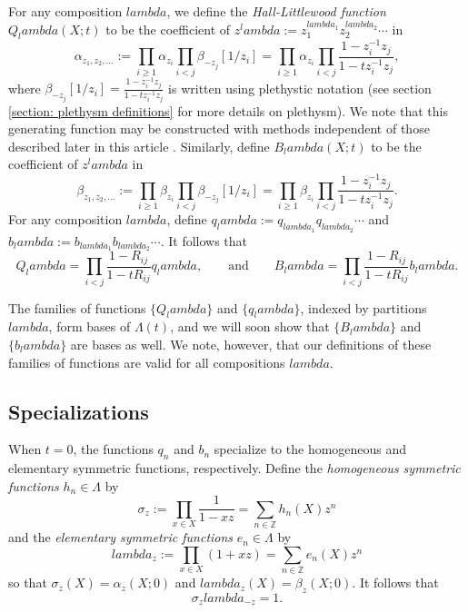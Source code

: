 \documentclass[12pt]{amsart}%
\def\lambda{lambda}%
\theoremstyle{remark}
\theoremstyle{definition}
\newcommand{\Z}{\mathbb{Z}}
\begin{document}
    For any composition $\lambda$, we define the \emph{Hall-Littlewood function} $Q_\lambda(X;t)$ to be the coefficient of $z^\lambda:=z_1^{\lambda_1}z_2^{\lambda_2}\cdots$ in
    \begin{equation}
        \alpha_{z_1,z_2,\ldots}:=\prod_{i\geq1}\alpha_{z_i}\prod_{i<j}\beta_{-z_j}[1/z_i]=\prod_{i\geq1}\alpha_{z_i}\prod_{i<j}\frac{1-z_i^{-1}z_j}{1-tz_i^{-1}z_j},
    \end{equation}
    where $\beta_{-z_j}[1/z_i]=\frac{1-z_i^{-1}z_j}{1-tz_i^{-1}z_j}$ is written using plethystic notation (see section \ref{section: plethysm definitions} for more details on plethysm). We note that this generating function may be constructed with methods independent of those described later in this article \cite[p.~211]{macdonald:1995}. Similarly, define $B_\lambda(X;t)$ to be the coefficient of $z^\lambda$ in
    \begin{equation}
        \beta_{z_1,z_2,\ldots}:=\prod_{i\geq1}\beta_{z_i}\prod_{i<j}\beta_{-z_j}[1/z_i]=\prod_{i\geq1}\beta_{z_i}\prod_{i<j}\frac{1-z_i^{-1}z_j}{1-tz_i^{-1}z_j}.
    \end{equation}
    For any composition $\lambda$, define $q_\lambda:=q_{\lambda_1}q_{\lambda_2}\cdots$ and $b_\lambda:=b_{\lambda_1}b_{\lambda_2}\cdots$. It follows that
    \begin{equation}\label{eqn: raising operator formulas}
        Q_\lambda=\prod_{i<j}\frac{1-R_{ij}}{1-tR_{ij}}q_\lambda,\qquad\text{and}\qquad B_\lambda=\prod_{i<j}\frac{1-R_{ij}}{1-tR_{ij}}b_\lambda.
    \end{equation}

    The families of functions $\{Q_\lambda\}$ and $\{q_\lambda\}$, indexed by partitions $\lambda$, form bases of $\Lambda(t)$, and we will soon show that $\{B_\lambda\}$ and $\{b_\lambda\}$ are bases as well. We note, however, that our definitions of these families of functions are valid for all compositions $\lambda$.

    \subsection{Specializations}

    When $t=0$, the functions $q_n$ and $b_n$ specialize to the homogeneous and elementary symmetric functions, respectively. Define the \emph{homogeneous symmetric functions} $h_n\in\Lambda$ by
    \begin{equation}\label{eqn: sigma_z}
        \sigma_z:=\prod_{x\in X}\frac{1}{1-xz}=\sum_{n\in\Z}h_n(X)z^n
    \end{equation}
    and the \emph{elementary symmetric functions} $e_n\in\Lambda$ by
    \begin{equation}
        \lambda_z:=\prod_{x\in X}(1+xz)=\sum_{n\in\Z}e_n(X)z^n
    \end{equation}
    so that $\sigma_z(X)=\alpha_z(X;0)$ and $\lambda_z(X)=\beta_z(X;0)$. It follows that
    \begin{equation}\label{eqn: sigma lambda = 1}
        \sigma_z\lambda_{-z}=1.
    \end{equation}
    
\end{document}
